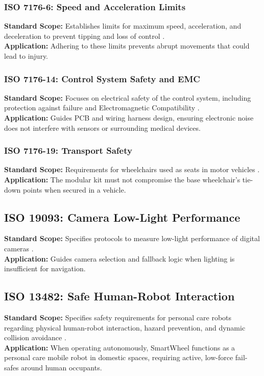 \documentclass[12pt,a4paper]{report}
\begin{document}
\subsubsection{ISO 7176-6: Speed and Acceleration Limits}
\textbf{Standard Scope:} Establishes limits for maximum speed, acceleration, and deceleration to prevent tipping and loss of control \cite{iso7176_6}.\\
\textbf{Application:} Adhering to these limits prevents abrupt movements that could lead to injury.

\subsubsection{ISO 7176-14: Control System Safety and EMC}
\textbf{Standard Scope:} Focuses on electrical safety of the control system, including protection against failure and Electromagnetic Compatibility \cite{iso7176_14}.\\
\textbf{Application:} Guides PCB and wiring harness design, ensuring electronic noise does not interfere with sensors or surrounding medical devices.

\subsubsection{ISO 7176-19: Transport Safety}
\textbf{Standard Scope:} Requirements for wheelchairs used as seats in motor vehicles \cite{iso7176_19}.\\
\textbf{Application:} The modular kit must not compromise the base wheelchair's tie-down points when secured in a vehicle.

\subsection{ISO 19093: Camera Low-Light Performance}
\textbf{Standard Scope:} Specifies protocols to measure low-light performance of digital cameras \cite{iso19093}.\\
\textbf{Application:} Guides camera selection and fallback logic when lighting is insufficient for navigation.



\subsection{ISO 13482: Safe Human-Robot Interaction}
\textbf{Standard Scope:} Specifies safety requirements for personal care robots regarding physical human-robot interaction, hazard prevention, and dynamic collision avoidance \cite{iso13482}.\\
\textbf{Application:} When operating autonomously, SmartWheel functions as a personal care mobile robot in domestic spaces, requiring active, low-force fail-safes around human occupants.
\end{document}
